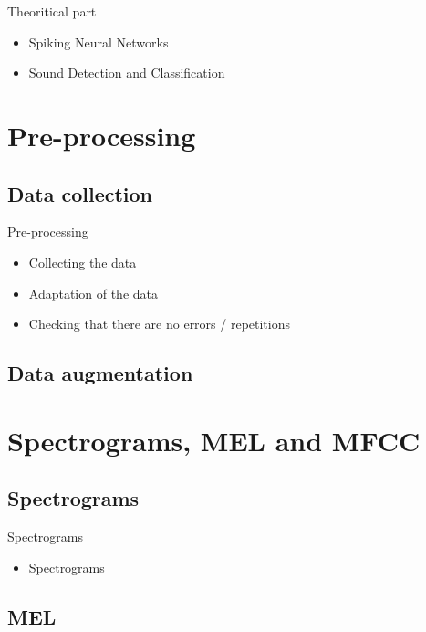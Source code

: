\documentclass[aspectratio=169, 11pt]{beamer}
\begin{document}
\begin{frame}{Theoritical part}
  \begin{itemize}
    \item Spiking Neural Networks
    \item Sound Detection and Classification
  \end{itemize}
\end{frame}


\section{Pre-processing}

\subsection{Data collection}

\begin{frame}{Pre-processing}
  \begin{itemize}
    \item Collecting the data
    \item Adaptation of the data
    \item Checking that there are no errors / repetitions
  \end{itemize}
\end{frame}

\subsection{Data augmentation}

\section{Spectrograms, MEL and MFCC}
\subsection{Spectrograms}

\begin{frame}{Spectrograms}
  \begin{itemize}
    \item Spectrograms
  \end{itemize}
\end{frame}

\subsection{MEL}
\end{document}

